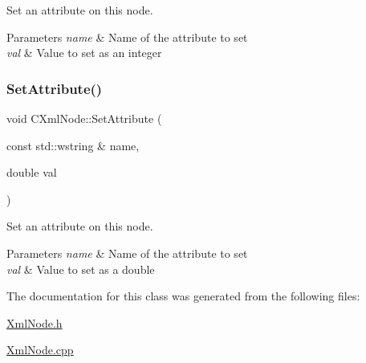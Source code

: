 Set an attribute on this node. 


\begin{DoxyParams}{Parameters}
{\em name} & Name of the attribute to set \\
\hline
{\em val} & Value to set as an integer \\
\hline
\end{DoxyParams}
\mbox{\label{classxmlnode_1_1_c_xml_node_a1bfd97eb8de5e6f769b5ed29039b91ea}} 
\subsubsection{\texorpdfstring{SetAttribute()}{SetAttribute()}\hspace{0.1cm}{\footnotesize\ttfamily [3/3]}}
{\footnotesize\ttfamily void C\+Xml\+Node\+::\+Set\+Attribute (\begin{DoxyParamCaption}\item[{const std\+::wstring \&}]{name,  }\item[{double}]{val }\end{DoxyParamCaption})}



Set an attribute on this node. 


\begin{DoxyParams}{Parameters}
{\em name} & Name of the attribute to set \\
\hline
{\em val} & Value to set as a double \\
\hline
\end{DoxyParams}


The documentation for this class was generated from the following files\+:\begin{DoxyCompactItemize}
\item 
\mbox{\hyperlink{_xml_node_8h}{Xml\+Node.\+h}}\item 
\mbox{\hyperlink{_xml_node_8cpp}{Xml\+Node.\+cpp}}\end{DoxyCompactItemize}

